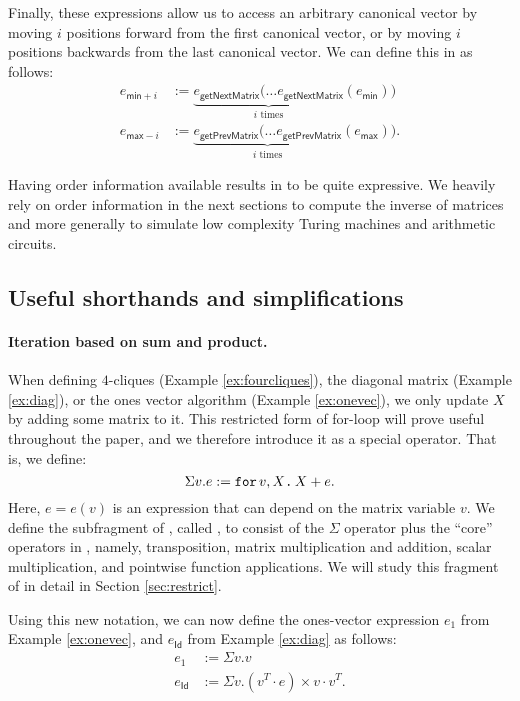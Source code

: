 Finally, these expressions allow us to access an arbitrary canonical vector by moving $i$ positions forward from the first canonical vector, or by moving $i$ positions backwards from the last canonical vector. We can define this in \langfor as follows:  
\begin{align*}
e_{\mathsf{min}+i} &:= \underbrace{e_{\mathsf{getNextMatrix}}(\ldots e_{\mathsf{getNextMatrix}}}_{i \text{ times}}(e_{\mathsf{min}}))\\
e_{\mathsf{max}-i} &:= \underbrace{e_{\mathsf{getPrevMatrix}}(\ldots e_{\mathsf{getPrevMatrix}}}_{i \text{ times}}(e_{\mathsf{max}})).
\end{align*}

Having order information available results in \langfor to be quite expressive.
We heavily rely on order information in the next sections to compute the inverse of matrices and more generally to simulate low complexity Turing machines and arithmetic circuits.


\subsection{Useful shorthands and simplifications}\label{sec:queries:simp}

\paragraph{Iteration based on sum and product.} When defining $4$-cliques (Example \ref{ex:fourcliques}), the diagonal matrix (Example \ref{ex:diag}), or the ones vector algorithm (Example \ref{ex:onevec}), we 
 only update $X$ by adding some matrix to it. This restricted form of for-loop will prove useful throughout the paper, and we therefore introduce it as a special operator. That is, we define:
$$\Sigma v. e := \texttt{for}\, v,X \texttt{.}\, X + e.$$
Here, $e=e(v)$ is an expression that can depend on the matrix variable $v$. We define the subfragment of \langfor, called \langsum, to consist of the $\Sigma$ operator plus the ``core'' operators in \lang, namely, transposition, matrix multiplication and addition, scalar multiplication, and pointwise function applications. We will study this fragment of \langfor in detail in Section \ref{sec:restrict}.

Using this new notation, we can now define the ones-vector expression $e_1$ from Example \ref{ex:onevec}, and $e_\mathsf{Id}$ from Example \ref{ex:diag} as follows:
\begin{align*}
e_1 &:= \Sigma v. v\\
e_\mathsf{Id} &:= \Sigma v. (v^T\cdot e)\times v\cdot v^T.
\end{align*}

